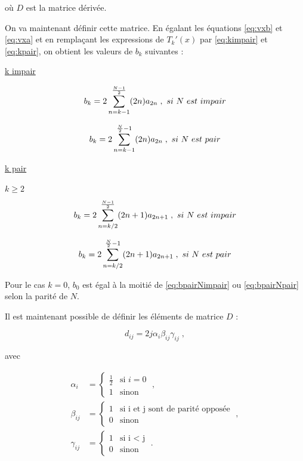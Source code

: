 \documentclass{report}
\begin{document}
où $D$ est la matrice dérivée.

On va maintenant définir cette matrice. En égalant les équations \eqref{eq:vxb} et \eqref{eq:vxa} et en remplaçant les expressions de $T_{k}'(x)$ par \eqref{eq:kimpair} et \eqref{eq:kpair}, on obtient les valeurs de $b_{k}$ suivantes :

\underline{k impair} 

\begin{equation}
b_{k} = 2\sum_{n=k-1}^{\frac{N-1}{2}}(2n)a_{2n} \;, \\\\\ si \ N \ est \ impair
\end{equation}

\begin{equation}
b_{k} = 2\sum_{n=k-1}^{\frac{N}{2}-1}(2n) a_{2n} \;, \\\\\ si \ N \ est \ pair
\end{equation}


\underline{k pair} 

 $k\geq2$
\begin{equation}\label{eq:bpairNimpair}
b_{k} = 2\sum_{n=k/2}^{\frac{N-1}{2}}(2n+1)a_{2n+1} \;, \\\\\ si \ N \ est \ impair
\end{equation}

\begin{equation}\label{eq:bpairNpair}
b_{k} = 2\sum_{n=k/2}^{\frac{N}{2}-1}(2n+1)a_{2n+1} \;, \\\\\ si \ N \ est \ pair
\end{equation}

Pour le cas $k=0$, $b_{0}$ est égal à la moitié de \eqref{eq:bpairNimpair} ou \eqref{eq:bpairNpair} selon la parité de $N$.

Il est maintenant possible de définir les éléments de matrice $D$ :

\begin{equation}
d_{ij} = 2j\alpha_{i}\beta_{ij}\gamma_{ij} \;, 
\end{equation}

avec

\begin{align}
\alpha_{i} &= 
  \begin{cases}
    \frac{1}{2} & \text{si $i =0$} \\
1 & \text{sinon}
  \end{cases}\;,\\
\beta_{ij} &=
  \begin{cases}
    1 & \text{si i et j sont de parité opposée}\\
0 & \text{sinon}
  \end{cases}\;,\\
 \gamma_{ij} &=
  \begin{cases}
    1 & \text{si i < j}\\
   0 & \text{sinon}
  \end{cases}\;.
\end{align}
\end{document}
